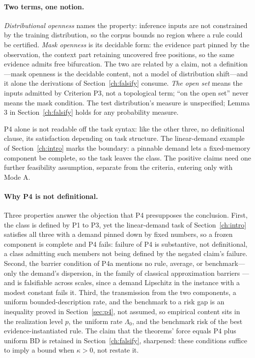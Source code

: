 \paragraph{Two terms, one notion.} \emph{Distributional openness} names the property: inference inputs are not constrained by the training distribution, so the corpus bounds no region where a rule could be certified. \emph{Mask openness} is its decidable form: the evidence part pinned by the observation, the context part retaining uncovered free positions, so the same evidence admits free bifurcation. The two are related by a claim, not a definition---mask openness is the decidable content, not a model of distribution shift---and it alone the derivations of Section~\ref{ch:falsify} consume. \emph{The open set} means the inputs admitted by Criterion P3, not a topological term; ``on the open set'' never means the mask condition. The test distribution's measure is unspecified; Lemma 3 in Section~\ref{ch:falsify} holds for any probability measure.

P4 alone is not readable off the task syntax: like the other three, no definitional clause, its satisfaction depending on task structure. The linear-demand example of Section~\ref{ch:intro} marks the boundary: a pinnable demand lets a fixed-memory component be complete, so the task leaves the class. The positive claims need one further feasibility assumption, separate from the criteria, entering only with Mode A.

\paragraph{Why P4 is not definitional.} Three properties answer the objection that P4 presupposes the conclusion. First, the class is defined by P1 to P3, yet the linear-demand task of Section~\ref{ch:intro} satisfies all three with a demand pinned down by fixed numbers, so a frozen component is complete and P4 fails: failure of P4 is substantive, not definitional, a class admitting such members not being defined by the negated claim's failure. Second, the barrier condition of P4a mentions no rule, average, or benchmark---only the demand's dispersion, in the family of classical approximation barriers \citep{kolmogorov1936,pinkus1985}---and is falsifiable across scales, since a demand Lipschitz in the instance with a modest constant fails it. Third, the transmission from the two components, a uniform bounded-description rate, and the benchmark to a risk gap is an inequality proved in Section~\ref{sec:p4}, not assumed, so empirical content sits in the realization level $p$, the uniform rate $\Lambda_0$, and the benchmark risk of the best evidence-instantiated rule. The claim that the theorems' force equals P4 plus uniform BD is retained in Section~\ref{ch:falsify}, sharpened: these conditions suffice to imply a bound when $\kappa>0$, not restate it.

